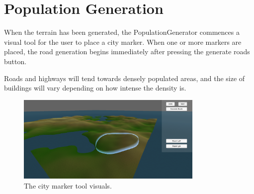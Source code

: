 \section{Population Generation}

When the terrain has been generated, the PopulationGenerator commences a visual tool for the user to place a city marker.
When one or more markers are placed, the road generation begins immediately after pressing the generate roads button. 

Roads and highways will tend towards densely populated areas, and the size of buildings will vary depending on how intense the density is.

\begin{figure}[h!]
  \centering

  \includegraphics[width=0.8\textwidth]{figure/city_marker_tool.png}
  \caption{The city marker tool visuals.}

  \label{fig:citymarker}
\end{figure}